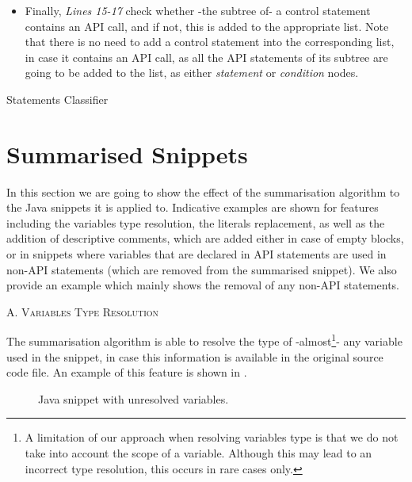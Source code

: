 \begin{itemize}
\item Finally, \textit{Lines 15-17} check whether -the subtree of- a control statement contains an API call, and if not, this is added to the appropriate list. Note that there is no need to add a control statement into the corresponding list, in case it contains an API call, as all the API statements of its subtree are going to be added to the list, as either \textit{statement} or \textit{condition} nodes.
\end{itemize}

\begin{algorithm}
\small
\caption[Statements Classifier]{Statements Classifier}
\label{algorithms:statements-classifier}

\end{algorithm}

\clearpage

\section{Summarised Snippets}
\label{sec:summarised-snippets}

In this section we are going to show the effect of the summarisation algorithm to the Java snippets it is applied to. Indicative examples are shown for features including the variables type resolution, the literals replacement, as well as the addition of descriptive comments, which are added either in case of empty blocks, or in snippets where variables that are declared in API statements are used in non-API statements (which are removed from the summarised snippet). We also provide an example which mainly shows the removal of any non-API statements.
\vspace{10pt}

\noindent
\textsc{A. Variables Type Resolution}
\vspace{5pt}

The summarisation algorithm is able to resolve the type of -almost\footnote{A limitation of our approach when resolving variables type is that we do not take into account the scope of a variable. Although this may lead to an incorrect type resolution, this occurs in rare cases only.}- any variable used in the snippet, in case this information is available in the original source code file. An example of this feature is shown in .

\begin{figure}[h]

\vspace{-10pt}
\caption[Java snippet with unresolved variables]{Java snippet with unresolved variables.}
\label{listings:resolve-types-org}
\end{figure}
\vspace{-20pt}

